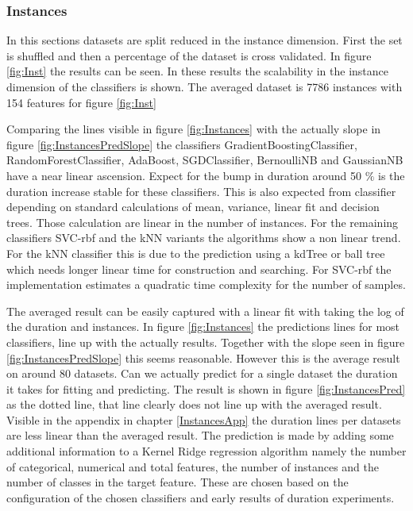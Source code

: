 \documentclass[a4paper,10pt]{article}
\begin{document}
\newpage
\subsubsection{Instances}
In this sections datasets are split reduced in the instance dimension. First the set is shuffled and then a percentage of the dataset is cross validated. In figure \ref{fig:Inst} the results can be seen. In these results the scalability in the instance dimension of the classifiers is shown. The averaged dataset is 7786 instances with 154 features for figure \ref{fig:Inst} 

Comparing the lines visible in figure \ref{fig:Instances} with the actually slope in figure \ref{fig:InstancesPredSlope} the classifiers GradientBoostingClassifier, RandomForestClassifier, AdaBoost, SGDClassifier, BernoulliNB and GaussianNB have a near linear ascension. Expect for the bump in duration around 50 $\%$ is the duration increase stable for these classifiers. This is also expected from classifier depending on standard calculations of mean, variance, linear fit and decision trees. Those calculation are linear in the number of instances. For the remaining classifiers SVC-rbf and the kNN variants the algorithms show a non linear trend. For the kNN classifier this is due to the prediction using a kdTree or ball tree which needs longer linear time for construction and searching. For SVC-rbf the implementation estimates a quadratic time complexity for the number of samples. 

The averaged result can be easily captured with a linear fit with taking the log of the duration and instances. In figure \ref{fig:Instances} the predictions lines for most classifiers, line up with the actually results. Together with the slope seen in figure \ref{fig:InstancesPredSlope} this seems reasonable. However this is the average result on around 80 datasets. Can we actually predict for a single dataset the duration it takes for fitting and predicting. The result is shown in figure \ref{fig:InstancesPred} as the dotted line, that line clearly does not line up with the averaged result. Visible in the appendix in chapter \ref{InstancesApp} the duration lines per datasets are less linear than the averaged result. The prediction is made by adding some additional information to a Kernel Ridge regression algorithm namely the number of categorical, numerical and total features, the number of instances and the number of classes in the target feature. These are chosen based on the configuration of the chosen classifiers and early results of duration experiments. 
\end{document}
